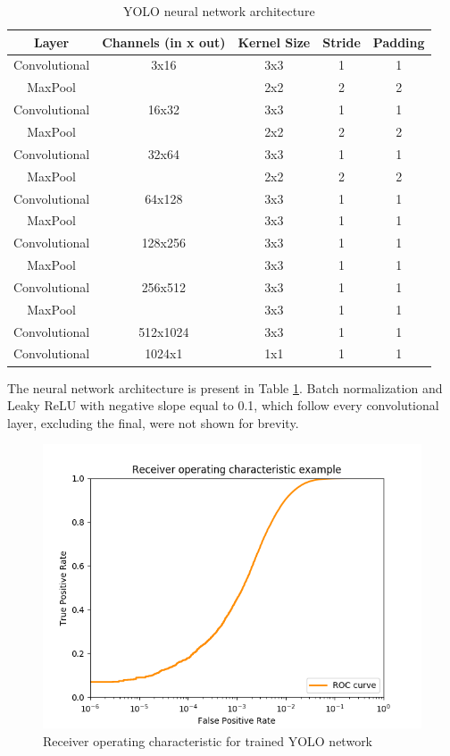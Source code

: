 \documentclass{ctuthesis}
\begin{document}
\begin{table}[htbp]
\centering
 \begin{tabular}{||c c c c c||} 
 \hline
 Layer & Channels (in x out) &  Kernel Size & Stride & Padding \\ [0.5ex] 
 \hline\hline
 Convolutional & 3x16 & 3x3 & 1 & 1 \\ 
 \hline
 MaxPool & & 2x2 & 2 & 2 \\
 \hline
 Convolutional & 16x32 & 3x3 & 1 & 1 \\ 
 \hline
 MaxPool & & 2x2 & 2 & 2 \\
 \hline
 Convolutional & 32x64 & 3x3 & 1 & 1 \\ 
 \hline
 MaxPool & & 2x2 & 2 & 2 \\
 \hline
 Convolutional & 64x128 & 3x3 & 1 & 1 \\ 
 \hline
 MaxPool & & 3x3 & 1 & 1\\
 \hline
 Convolutional & 128x256 & 3x3 & 1 & 1 \\ 
 \hline
 MaxPool & & 3x3 & 1 & 1\\
 \hline
 Convolutional & 256x512 & 3x3 & 1 & 1 \\ 
 \hline
 MaxPool & & 3x3 & 1 & 1\\
 \hline
 Convolutional & 512x1024 & 3x3 & 1 & 1 \\ 
 \hline
 Convolutional & 1024x1 & 1x1 & 1 & 1\\ [1ex] 
 \hline
\end{tabular}
\caption{YOLO neural network architecture}
\label{table:1}
\end{table}

The neural network architecture is present in Table \ref{table:1}. Batch normalization and Leaky ReLU with negative slope equal to 0.1, which follow every convolutional layer, excluding the final, were not shown for brevity. 

\begin{figure}[htbp]
    \centering
    \includegraphics[width=\textwidth]{net_epoch100.png}
    \caption{Receiver operating characteristic for trained YOLO network}
    \label{fig:yolo-roc}
\end{figure}
\end{document}
